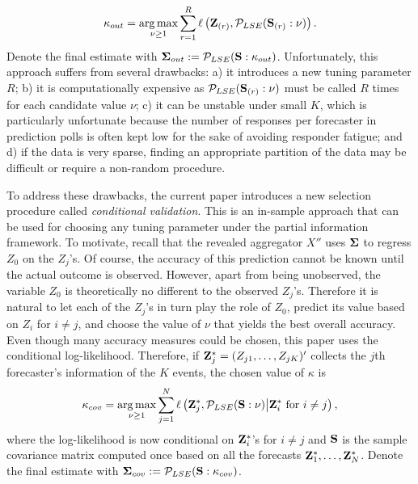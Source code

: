 \documentclass[11pt]{article}
\DeclareMathOperator*{\argmax}{arg\,max}
\theoremstyle{definition}
\theoremstyle{definition}
\def\bSigma{{\bf \Sigma}}
\def\Z{{\bf Z}}
\def\SS{{\bf S}}
\begin{document}
 \begin{align}
\kappa_{out} = \argmax_{\nu \geq 1} \sum_{r=1}^R \ell\left( \Z_{(r)}, \mathcal{P}_{LSE}(\SS_{(r)} : \nu)\right).
\label{kappa_out}
\end{align}
Denote the final estimate with $\bSigma_{out} := \mathcal{P}_{LSE}(\SS : \kappa_{out})$. 
Unfortunately, this approach suffers from several drawbacks: a) it introduces a new tuning parameter $R$; b) it is computationally expensive as $\mathcal{P}_{LSE}(\SS_{(r)} : \nu)$ must be called $R$ times for each candidate value $\nu$; c) it can be unstable under small $K$, which is particularly unfortunate because
 the number of responses per forecaster in prediction polls is often kept low for the sake of avoiding responder fatigue; and d) if the data is very sparse, finding an appropriate partition of the data may be difficult or require a non-random procedure. 



To address these drawbacks, the current paper introduces a new selection procedure called \textit{conditional validation}. This is an in-sample approach that can be used for choosing any tuning parameter under the partial information framework. To motivate, recall that the revealed aggregator $X''$ uses $\bSigma$ to regress  $Z_0$ on the $Z_{j}$'s. 
 Of course, the accuracy of this prediction cannot be known until the actual outcome is observed. However, apart from being unobserved, the variable $Z_0$ is theoretically no different to the observed $Z_{j}$'s. Therefore it is natural to let each of the $Z_{j}$'s in turn play the role of $Z_0$, predict its value based on $Z_{i}$ for $i \neq j$, and choose the value of $\nu$ that yields the best overall accuracy. Even though many accuracy measures could be chosen, this paper uses the conditional log-likelihood. Therefore, if $\Z_j^* = (Z_{j1}, \dots, Z_{jK})'$ collects the $j$th forecaster's information of the $K$ events, the chosen value of $\kappa$ is
  \begin{align}
\kappa_{cov} = \argmax_{\nu \geq 1} \sum_{j=1}^N \ell \left( \Z_{j}^*, \mathcal{P}_{LSE}(\SS : \nu) \big| \Z_i^* \text{ for } i \neq j\right), \label{kappa_cov}
\end{align}
where the log-likelihood is now conditional on $\Z_i^*$'s for $i \neq j$ and $\SS$ is the sample covariance matrix computed once based on all the forecasts $\Z_1^*, \dots, \Z_N^*$. Denote the final estimate with $\bSigma_{cov} := \mathcal{P}_{LSE}(\SS : \kappa_{cov})$.  
\end{document}
